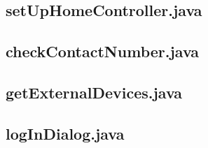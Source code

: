 \subsection*{setUpHomeController.java}


\subsection*{checkContactNumber.java}


\subsection*{getExternalDevices.java}


\subsection*{logInDialog.java}
